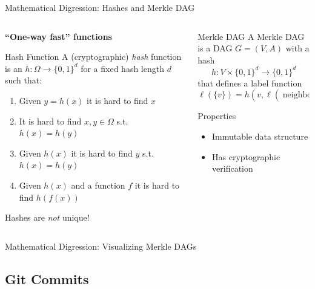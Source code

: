\documentclass[xetex, handout]{beamer}
\begin{document}
\begin{frame}{Mathematical Digression: Hashes and Merkle DAG}
  \begin{columns}
    \begin{column}{.5\linewidth}
      \textbf{``One-way fast'' functions}
      \begin{block}{Hash Function}
        A (cryptographic) \emph{hash} function is an $h : \Omega \to \{0,1\}^d$
        for a fixed hash length $d$ such that:
        \begin{enumerate}
          \item Given $y = h(x)$ it is hard to find $x$
          \item It is hard to find $x,y \in \Omega$ s.t. $h(x) = h(y)$
	  \item Given $h(x)$ it is hard to find $y$ s.t. $h(x) = h(y)$
          \item Given $h(x)$ and a function $f$ it is hard to find $h(f(x))$
        \end{enumerate}
      \end{block}
      Hashes are \emph{not} unique!
    \end{column}
    \begin{column}{.5\linewidth}
      \begin{block}{Merkle DAG}
        A Merkle DAG is a DAG $G = (V,A)$ with a hash
        \[
          h : V \times \{0,1\}^d \to \{0,1\}^d
        \]
        that defines a label function
        \[
          \ell(\{v\}) = h(v, \ell(\operatorname{neighbors}^+(v)))
        \]
      \end{block}
      \begin{alertblock}{Properties}
        \begin{itemize}
          \item Immutable data structure
          \item Has cryptographic verification
        \end{itemize}
      \end{alertblock}
    \end{column}
  \end{columns}
\end{frame}

\begin{frame}[fragile]{Mathematical Digression: Visualizing Merkle DAGs}
\end{frame}

\subsection{Git Commits}
\end{document}

